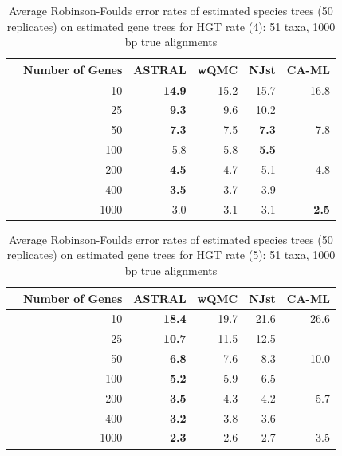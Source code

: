 \begin{table}[h!]
\begin{tabular}{rrrrrr}
 & Number of Genes & ASTRAL & wQMC   & NJst & CA-ML \\
\hline
 & 10 & \textbf{14.9} & 15.2 &   15.7 & 16.8\\
 & 25 & \textbf{9.3} & 9.6 &  10.2 & \\
 & 50 & \textbf{7.3} & 7.5  & \textbf{7.3} & 7.8\\
 & 100 & 5.8 & 5.8 &   \textbf{5.5} & \\
 & 200 & \textbf{4.5} & 4.7   & 5.1 & 4.8 \\
 & 400 & \textbf{3.5} & 3.7  & 3.9 & \\
 & 1000 & 3.0 & 3.1 &  3.1 & \textbf{2.5} \\
\end{tabular}
\caption[Error rates of estimated species trees (50 replicates)  on estimated gene trees for HGT rate 4]{Average Robinson-Foulds error rates of estimated species trees (50 replicates)  on estimated gene trees for HGT rate (4): 51 taxa, 1000 bp true alignments}

\label{hgt::table4}
\end{table}

\begin{table}[h!]
\begin{tabular}{rrrrrr}
 & Number of Genes & ASTRAL & wQMC   & NJst & CA-ML\\
\hline
 & 10 & \textbf{18.4} & 19.7 &   21.6 & 26.6 \\
 & 25 & \textbf{10.7} & 11.5   & 12.5 & \\
 & 50 & \textbf{6.8} & 7.6 &  8.3 & 10.0\\
 & 100 & \textbf{5.2} & 5.9 &   6.5 & \\
 & 200 & \textbf{3.5} & 4.3 &   4.2 & 5.7 \\
 & 400 & \textbf{3.2} & 3.8 &   3.6 & \\
 & 1000 & \textbf{2.3} & 2.6   & 2.7 & 3.5 \\
\end{tabular}
\caption[Error rates of estimated species trees (50 replicates)  on estimated gene trees for HGT rate 5]{Average Robinson-Foulds error rates of estimated species trees (50 replicates)  on estimated gene trees for HGT rate (5): 51 taxa, 1000 bp true alignments}

\label{hgt::table5}
\end{table}

